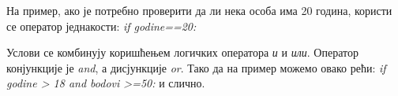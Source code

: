 На пример, ако је потребно проверити да ли нека особа има 20 година, користи се оператор једнакости: \emph{if godine==20:}

Услови се комбинују коришћењем логичких оператора \emph{и} и \emph{или}. Оператор конјункције је \emph{and}, а дисјункције \emph{or}. Тако да на пример можемо овако рећи: \emph{if godine > 18 and bodovi >=50:} и слично.
